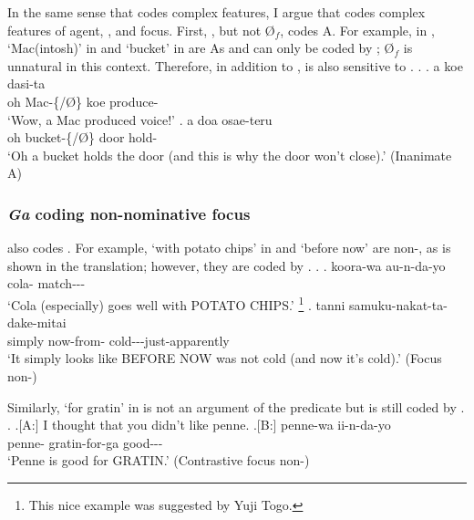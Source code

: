 In the same sense that  codes complex features,
I argue that  codes complex features
of agent, , and focus.
First,
, but not {\O$_{f}$}, codes  A.
For example, in \Next,
 `Mac(intosh)' in \Next[a] and  `bucket' in \Next[b]
are  As
and can only be coded by ;
{\O$_{f}$} is unnatural in this context.
Therefore, in addition to ,
 is also sensitive to .
%
\ex. \label{ExInanimateA}
 \ag. a  koe dasi-ta \\
  oh Mac-\{/{\O}\} koe produce- \\
  `Wow, a Mac produced voice!'
 \bg. a  doa osae-teru \\
  oh bucket-\{/{\O}\} door hold- \\
  `Oh a bucket holds the door (and this is why the door won't close).'
   \hfill{(Inanimate A)}

\subsubsection{\textit{Ga} coding non-nominative focus}\label{Par:CasePar:Ga:GaFoc}

 also codes .
For example, 
 `with potato chips' in \Next[a] and
 `before now'
are non-,
as is shown in the translation;
however, they are coded by .
%
\ex.\label{ExNon-ArgFocus}
 \ag. koora-wa  au-n-da-yo \\
   cola-  match--- \\
   `Cola (especially) goes well with POTATO CHIPS.'%
    \footnote{
    This nice example was suggested by Yuji Togo.
    }
 \bg. tanni  samuku-nakat-ta-dake-mitai \\
   simply now-from- cold---just-apparently \\
   `It simply looks like BEFORE NOW was not cold (and now it's cold).'
 \hfill{(Focus non-)}

Similarly,
 `for gratin' in \Next[B] is not an argument of the predicate
but is still coded by .
%
\ex. \a.[A:] I thought that you didn't like penne.
	\bg.[B:] penne-wa  ii-n-da-yo \\
	penne- gratin-for-{ga} good--- \\
	`Penne is good for GRATIN.' \hfill{(Contrastive focus non-)}

